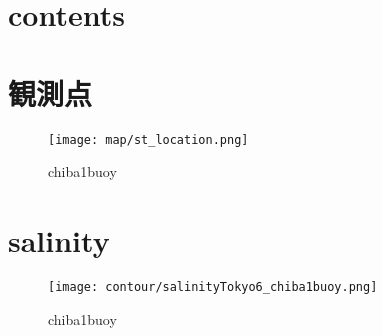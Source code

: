 \documentclass[12pt,a4paper]{jarticle}
\begin{document}
\section{contents}



\section{観測点}
\begin{figure}[hbtp]
  \texttt{[image: map/st\_location.png]}
  \caption{chiba1buoy}
  \label{地図}
\end{figure}

\section{salinity}
\begin{figure}[hbtp]
    \texttt{[image: contour/salinityTokyo6\_chiba1buoy.png]}
    \caption{chiba1buoy}
\end{figure}
\end{document}
